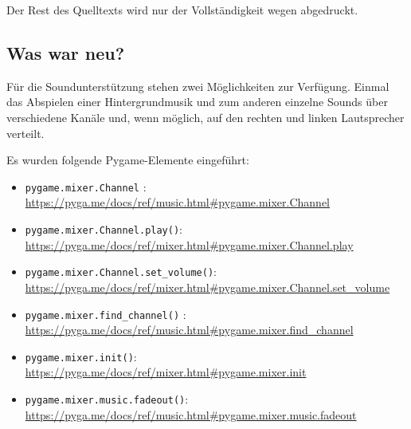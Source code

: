 Der Rest des Quelltexts wird nur der Vollständigkeit wegen abgedruckt.


\newpage
\subsection*{Was war neu?}

Für die Soundunterstützung stehen zwei Möglichkeiten zur Verfügung. Einmal das Abspielen einer Hintergrundmusik und zum anderen einzelne Sounds über verschiedene Kanäle und, wenn möglich, auf den rechten und linken Lautsprecher verteilt.

Es wurden folgende Pygame-Elemente eingeführt:
\begin{itemize}
	\item\texttt{pygame.mixer.Channel} :
\\ \url{https://pyga.me/docs/ref/music.html#pygame.mixer.Channel}

	\item \texttt{pygame.mixer.Channel.play()}:
\\ \url{https://pyga.me/docs/ref/mixer.html#pygame.mixer.Channel.play}

	\item \texttt{pygame.mixer.Channel.set\_volume()}:
\\ \url{https://pyga.me/docs/ref/mixer.html#pygame.mixer.Channel.set_volume}

	\item\texttt{pygame.mixer.find\_channel()} :
\\ \url{https://pyga.me/docs/ref/music.html#pygame.mixer.find_channel}

	\item \texttt{pygame.mixer.init()}:
\\ \url{https://pyga.me/docs/ref/mixer.html#pygame.mixer.init}

	\item\texttt{pygame.mixer.music.fadeout()}:
\\ \url{https://pyga.me/docs/ref/music.html#pygame.mixer.music.fadeout}


\end{itemize}

